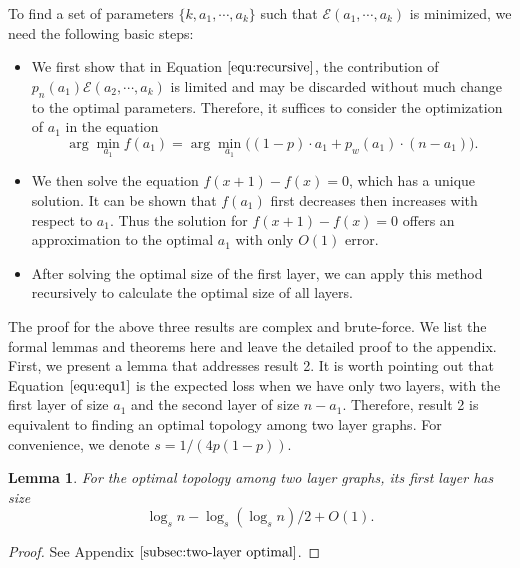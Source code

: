 \documentclass[a4paper,UKenglish]{lipics}
\newtheorem{lem}[thm]{Lemma}
\theoremstyle{definition}
\begin{document}
To find a set of parameters $\{k, a_1, \dotsb, a_k\}$ such that $\mathcal{E}(a_1, \dotsb, a_k)$ is minimized, we need the following basic steps:
\begin{itemize}
\item We first show that in Equation $\eqref{equ:recursive}$,  
		the contribution of $p_n(a_1)\mathcal{E}(a_2, \dotsb, a_k)$ is limited and 
		may be discarded without much change to the optimal parameters.
	Therefore, it suffices to consider the optimization of $a_1$ in the equation
	\begin{equation}
	\label{equ:equ1}
		\arg\min_{a_1} f(a_1) = \arg\min_{a_1} \Big( (1-p)\cdot a_1 + p_w(a_1)\cdot (n - a_1) \Big).
	\end{equation}
\item We then solve the equation $f(x+1) - f(x) = 0$, which has a unique solution.
	It can be shown that $f(a_1)$ first decreases then increases with respect to $a_1$.
	Thus the solution for $f(x+1) - f(x) = 0$ offers an approximation to the optimal $a_1$ with only $O(1)$ error.
\item After solving the optimal size of the first layer, we can apply this method recursively to calculate the optimal size of all layers.
\end{itemize}

The proof for the above three results are complex and brute-force.
We list the formal lemmas and theorems here and leave the detailed proof to the appendix.
First, we present a lemma that addresses result 2.
It is worth pointing out that Equation $\ref{equ:equ1}$ is the expected loss when we have only two layers,
	with the first layer of size $a_1$ and the second layer of size $n - a_1$.
Therefore, result 2 is equivalent to finding an optimal topology among two layer graphs.
For convenience, we denote $s = 1 / (4p(1-p))$.

\begin{lem}
\label{lem:twolayer}
For the optimal topology among two layer graphs, its first layer has size 
\begin{equation*}
\log_{s}n-\log_s( \log_s n)/2 + O(1).
\end{equation*}
\end{lem}
\begin{proof}
See Appendix $\ref{subsec:two-layer optimal}$.
\end{proof}
\end{document}
